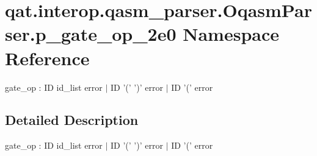 \hypertarget{namespaceqat_1_1interop_1_1qasm__parser_1_1OqasmParser_1_1p__gate__op__2e0}{\section{qat.\-interop.\-qasm\-\_\-parser.\-Oqasm\-Parser.\-p\-\_\-gate\-\_\-op\-\_\-2e0 Namespace Reference}
\label{namespaceqat_1_1interop_1_1qasm__parser_1_1OqasmParser_1_1p__gate__op__2e0}
}


gate\-\_\-op \-: I\-D id\-\_\-list error $|$ I\-D '(' ')' error $|$ I\-D '(' error  




\subsection{Detailed Description}
gate\-\_\-op \-: I\-D id\-\_\-list error $|$ I\-D '(' ')' error $|$ I\-D '(' error 